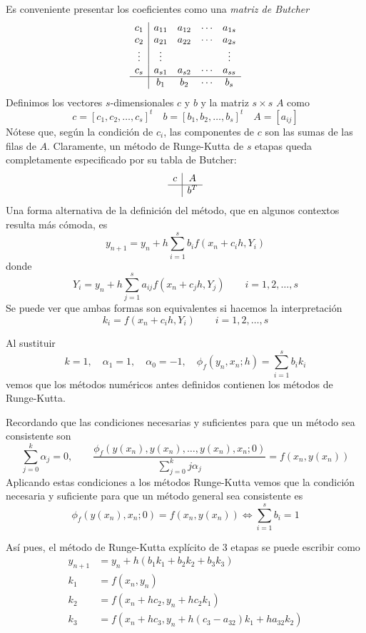 Es conveniente presentar los coeficientes como una \textit{matriz de Butcher}
$$\begin{array}{c|cccc}
     c_1 & a_{11} & a_{12} & \cdots &  a_{1s} \\
     c_2 & a_{21} & a_{22} & \cdots &  a_{2s} \\ 
     \vdots & \vdots & &  & \vdots \\ 
     c_s & a_{s1} & a_{s2} & \cdots &  a_{ss} \\ \hline
     & b_1 & b_2 & \cdots & b_s
\end{array}$$
Definimos los vectores $s$-dimensionales $c$ y $b$ y la matriz $s\times s$ $A$ como
$$c=[c_1, c_2, \ldots, c_s]^t \quad b = [b_1, b_2, \ldots, b_s]^t \quad A = [a_{ij}]$$
Nótese que, según la condici\'on de $c_i$, las componentes de $c$ son las sumas de las filas de $A$. Claramente, un método de Runge-Kutta de $s$ etapas queda completamente especificado por su tabla de Butcher:
\begin{equation*}
    \begin{array}{c|c}
        c & A \\
        \hline
        & b^T
    \end{array}
\end{equation*}
Una forma alternativa de la definici\'on del m\'etodo, que en algunos contextos resulta más cómoda, es
$$ y_{n+1} = y_n + h \sum_{i=1}^{s} b_i f(x_n + c_i h, Y_i)$$
donde
$$ Y_i = y_n + h \sum_{j=1}^{s} a_{ij} f(x_n + c_j h, Y_j) \qquad i = 1, 2, \dots, s$$
Se puede ver que ambas formas son equivalentes si hacemos la interpretación
$$k_i = f(x_n + c_i h, Y_i) \qquad i = 1, 2, \dots, s$$

Al sustituir $$k = 1, \quad \alpha_1 = 1, \quad \alpha_0 = -1, \quad \phi_f(y_n, x_n; h) = \sum_{i=1}^{s} b_i k_i$$
vemos que los m\'etodos num\'ericos antes definidos contienen los métodos de Runge-Kutta.

Recordando que las condiciones necesarias y suficientes para que un m\'etodo sea consistente son
$$\sum_{j=0}^{k} \alpha_j = 0, \qquad \frac{\phi_f(y(x_n), y(x_n), \dots, y(x_n), x_n; 0)}{\sum_{j=0}^{k} j \alpha_j} = f(x_n, y(x_n))$$
Aplicando estas condiciones a los m\'etodos Runge-Kutta vemos que la condición necesaria y suficiente para que un método general sea consistente es
$$\phi_f(y(x_n), x_n; 0) = f(x_n, y(x_n)) \iff \sum_{i=1}^{s} b_i = 1$$

Así pues, el método de Runge-Kutta explícito de 3 etapas se puede escribir como   
$$ \begin{aligned}     y_{n+1} &= y_n + h(b_1 k_1 + b_2 k_2 + b_3 k_3) \\     k_1 &= f(x_n, y_n) \\     k_2 &= f(x_n + h c_2, y_n + h c_2 k_1) \\     k_3 &= f(x_n + h c_3, y_n + h(c_3 - a_{32})k_1 + h a_{32} k_2) \end{aligned}$$

